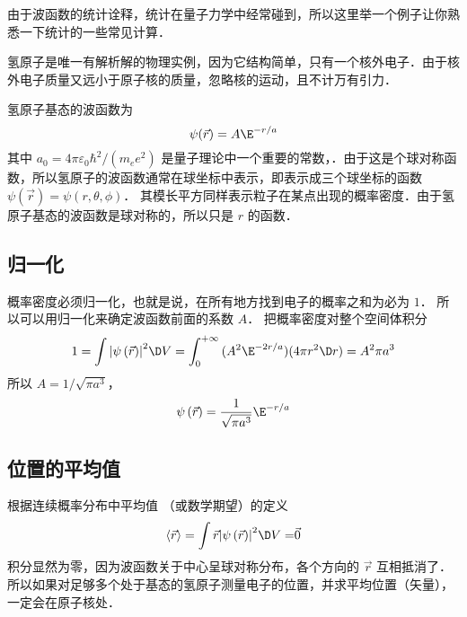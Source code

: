 

由于波函数的统计诠释，统计在量子力学中经常碰到，所以这里举一个例子让你熟悉一下统计的一些常见计算．

氢原子是唯一有解析解的物理实例，因为它结构简单，只有一个核外电子．由于核外电子质量又远小于原子核的质量，忽略核的运动，且不计万有引力．

氢原子基态的波函数为
\begin{equation}
\psi(\vec r) = A\E^{-r/a}
\end{equation}
其中 ${a_0} = {{4\pi {\varepsilon _0}{\hbar ^2}}}/({{{m_e}{e^2}}})$ 是量子理论中一个重要的常数，．由于这是个球对称函数，所以氢原子的波函数通常在球坐标中表示，即表示成三个球坐标的函数 $\psi \left( {\vec r} \right) = \psi \left( {r,\theta ,\phi } \right)$． 其模长平方同样表示粒子在某点出现的概率密度．由于氢原子基态的波函数是球对称的，所以只是 $r$ 的函数．

\subsection{归一化}
  
概率密度必须归一化，也就是说，在所有地方找到电子的概率之和为必为 $1$． 所以可以用归一化来确定波函数前面的系数 $A$． 把概率密度对整个空间体积分
\begin{equation}
    1 = \int {{{\left| {\psi \left( {\vec r} \right)} \right|}^2} \D V}  = \int_0^{ + \infty } {(A^2 \E^{-2r/a})(4\pi r^2\D r)}  = {A^2}\pi {a^3}
\end{equation}
所以 $A = {1}/{{\sqrt {\pi {a^3}} }}$， 
\begin{equation}
\psi \left( {\vec r} \right) = \frac{1}{{\sqrt {\pi {a^3}} }}{\E^{-r/a}}
\end{equation}

\subsection{位置的平均值}

 根据连续概率分布中平均值%
（或数学期望）的定义
\begin{equation}
\left\langle {\vec r} \right\rangle  = \int {\vec r{{\left| {\psi \left( {\vec r} \right)} \right|}^2} \D V = } \vec 0
\end{equation}
积分显然为零，因为波函数关于中心呈球对称分布，各个方向的 $\vec r$ 互相抵消了．所以如果对足够多个处于基态的氢原子测量电子的位置，并求平均位置（矢量）， 一定会在原子核处．

